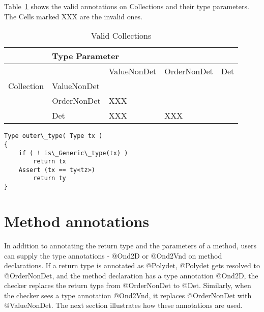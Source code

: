 Table~\ref{Tab:validity} shows the valid annotations on Collections and their type parameters.
The Cells marked XXX are the invalid ones.
\begin{table}[h]
	\centering
	\caption{Valid Collections}
	\label{Tab:validity}
	\begin{tabular}{|l|l|l|l|l|}
		\hline
		& 		\multicolumn{4}{l|}{Type Parameter}		                                                                   \\ \hline
		&             & ValueNonDet                                     & OrderNonDet              & Det \\ \cline{2-5}
		Collection    & ValueNonDet &                                                 &                          &     \\ \cline{2-5}
		& OrderNonDet &   XXX  &                          &     \\ \cline{2-5}
		& Det         &         XXX               &  	XXX	&     \\ \hline
	\end{tabular}
\end{table}



\begin{verbatim}
Type outer\_type( Type tx )
{
    if ( ! is\_Generic\_type(tx) )
        return tx
    Assert (tx == ty<tz>)
        return ty
}
\end{verbatim}

\section{Method annotations\label{method-annotations}}
In addition to annotating the return type and the parameters of a method, users can supply the type annotations -
@Ond2D or @Ond2Vnd on method declarations.
If a return type is annotated as @Polydet, @Polydet gets resolved to @OrderNonDet, and the method declaration has a type annotation @Ond2D,
the checker replaces the return type from @OrderNonDet to @Det. Similarly, when the checker sees a type annotation @Ond2Vnd, it
replaces @OrderNonDet with @ValueNonDet. The next section illustrates how these annotations are used.

